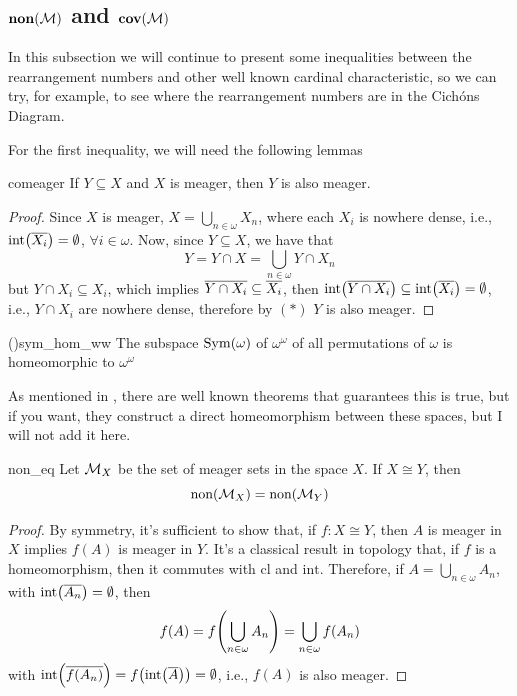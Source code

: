 \subsection{\texorpdfstring{$\mathbf{non}(\mathcal{M})$}{nonM} and \texorpdfstring{$\mathbf{cov}(\mathcal{M})$}{covM}}

In this subsection we will continue to present some inequalities between the rearrangement numbers and other well known cardinal characteristic, so we can try, for example, to see where the rearrangement numbers are in the Cichóns Diagram.

For the first inequality, we will need the following lemmas

\begin{lemma}{}{comeager}
    If $Y\subseteq X$ and $X$ is meager, then $Y$ is also meager.
\end{lemma}

\begin{proof}
    Since $X$ is meager, $X=\bigcup_{n\in\omega}X_n$, where each $X_i$ is nowhere dense, i.e., $\text{int}{\left(\overline{X_i}\right)}=\emptyset$, $\forall i\in\omega$. Now, since $Y\subseteq X$, we have that
    \begin{equation}
        Y=Y\cap X=\bigcup_{n\in\omega}Y\cap X_n\tag{$*$}
    \end{equation}
    but $Y\cap X_i\subseteq X_i$, which implies $\overline{Y\cap X_i}\subseteq\overline{X_i}$, then $\text{int}{\left(\overline{Y\cap X_i}\right)}\subseteq\text{int}{\left(\overline{X_i}\right)}=\emptyset$, i.e., $Y\cap X_i$ are nowhere dense, therefore by $(*)$ $Y$ is also meager.
\end{proof}

\begin{lemma}{(\cite{blass})}{sym_hom_ww}
    The subspace $\mathrm{Sym}(\omega)$ of $\omega^\omega$ of all permutations of $\omega$ is homeomorphic to $\omega^\omega$
\end{lemma}

As mentioned in \cite{blass}, there are well known theorems that guarantees this is true, but if you want, they construct a direct homeomorphism between these spaces, but I will not add it here.

\begin{corollary}{}{non_eq}
    Let $\mathcal{M}_X$ be the set of meager sets in the space $X$. If $X\cong Y$, then
    $$\text{non}(\mathcal{M}_X)=\text{non}(\mathcal{M}_Y)$$
\end{corollary}

\begin{proof}
    By symmetry, it's sufficient to show that, if $f:X\cong Y$, then $A$ is meager in $X$ implies $f(A)$ is meager in $Y$. It's a classical result in topology that, if $f$ is a homeomorphism, then it commutes with $\text{cl}$ and $\text{int}$. Therefore, if $A=\bigcup_{n\in\omega}A_n$, with $\text{int}{\left(\overline{A_n}\right)}=\emptyset$, then
    $$f(A)=f{\left(\bigcup_{n\in\omega}A_n\right)}=\bigcup_{n\in\omega}f(A_n)$$
    with $\text{int}{\left(\overline{f(A_n)}\right)}=f{\left(\text{int}{\left(\overline{A}\right)}\right)}=\emptyset$, i.e., $f(A)$ is also meager.
\end{proof}

